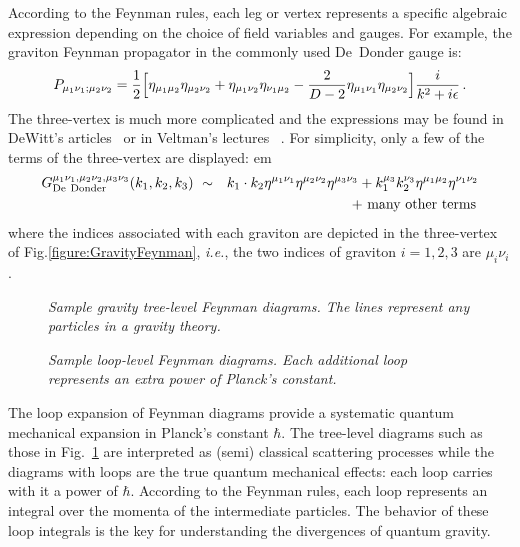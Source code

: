 \documentclass[12pt]{livrev}
\begin{document}
According to the Feynman rules, each leg or vertex represents 
a specific algebraic expression depending on the choice of field
variables and gauges. For example, the graviton Feynman propagator in the
commonly used De~Donder gauge is:
%
\begin{equation}
 P_{\mu_1 \nu_1 ; \mu_2 \nu_2} = 
 {1 \over 2} 
\Bigl[\eta_{\mu_1\mu_2} \eta_{\mu_2 \nu_2} 
+ \eta_{\mu_1\nu_2} \eta_{\nu_1\mu_2} 
- {2\over D-2} \eta_{\mu_1\nu_1} \eta_{\mu_2 \nu_2} \Bigr] 
{i\over k^2 + i\epsilon}\,. 
\label{GravityPropagator}
\end{equation}
%
The three-vertex is much more complicated and the expressions
may be found in DeWitt's articles~\cite{DeWitt67A,DeWitt67B} or in 
Veltman's lectures~\cite{VeltmanGravity} .  For simplicity,
only a few of the terms of the three-vertex are displayed: 
%
 em
\begin{eqnarray}
G_{\rm De\ Donder}^{\mu_1 \nu_1,\mu_2\nu_2,\mu_3\nu_3}(k_1,k_2,k_3)\ &\sim&
k_1 \cdot k_2 \eta^{\mu_1\nu_1}\eta^{\mu_2\nu_2}\eta^{\mu_3\nu_3} +
k_1^{\mu_3}k_2^{\nu_3}\eta^{\mu_1\mu_2}\eta^{\nu_1\nu_2} \nonumber\\
&& \hskip 2 cm 
\ +\ \hbox{many other terms}\,
\label{ThreeDeDonder}
\end{eqnarray}
%
where the indices associated with each graviton are depicted in the
three-vertex of Fig.\ref{figure:GravityFeynman}, {\it i.e.}, the two
indices of graviton $i=1,2,3$ are $\mu_i \nu_i$.



\begin{figure}[h]
  \def\epsfsize#1#2{.5#1}
  \centerline{}
  \caption{\it Sample gravity tree-level Feynman diagrams. The lines 
  represent any particles in a gravity theory.}
  \label{figure:GravityTrees}
\end{figure}


\begin{figure}[h]
  \def\epsfsize#1#2{.5#1}
  \centerline{}
  \caption{\it Sample loop-level Feynman diagrams. Each additional loop 
      represents an extra power of Planck's constant.}
  \label{figure:GravityLoops}
\end{figure}

The loop expansion of Feynman diagrams provide a systematic quantum
mechanical expansion in Planck's constant $\hbar$.  The tree-level
diagrams such as those in Fig.~\ref{figure:GravityTrees} are
interpreted as (semi) classical scattering processes while the
diagrams with loops are the true quantum mechanical effects: each loop
carries with it a power of $\hbar$.  According to the Feynman rules,
each loop represents an integral over the momenta of the intermediate
particles.  The behavior of these loop integrals is the key for
understanding the divergences of quantum gravity.
\end{document}
